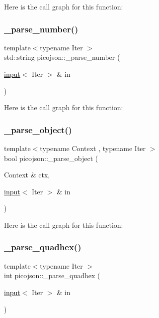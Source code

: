 Here is the call graph for this function\+:
\hypertarget{namespacepicojson_a771defe1d981b7091c2156bf4720625c}{}\label{namespacepicojson_a771defe1d981b7091c2156bf4720625c} 
\subsubsection{\texorpdfstring{\+\_\+parse\+\_\+number()}{\_parse\_number()}}
{\footnotesize\ttfamily template$<$typename Iter $>$ \\
std\+::string picojson\+::\+\_\+parse\+\_\+number (\begin{DoxyParamCaption}\item[{\hyperlink{classpicojson_1_1input}{input}$<$ Iter $>$ \&}]{in }\end{DoxyParamCaption})\hspace{0.3cm}{\ttfamily [inline]}}

Here is the call graph for this function\+:
\hypertarget{namespacepicojson_a480ed5e3461568672197a42e259a44c9}{}\label{namespacepicojson_a480ed5e3461568672197a42e259a44c9} 
\subsubsection{\texorpdfstring{\+\_\+parse\+\_\+object()}{\_parse\_object()}}
{\footnotesize\ttfamily template$<$typename Context , typename Iter $>$ \\
bool picojson\+::\+\_\+parse\+\_\+object (\begin{DoxyParamCaption}\item[{Context \&}]{ctx,  }\item[{\hyperlink{classpicojson_1_1input}{input}$<$ Iter $>$ \&}]{in }\end{DoxyParamCaption})\hspace{0.3cm}{\ttfamily [inline]}}

Here is the call graph for this function\+:
\hypertarget{namespacepicojson_a92d4f60542bbdfe8203f10e1fcce9368}{}\label{namespacepicojson_a92d4f60542bbdfe8203f10e1fcce9368} 
\subsubsection{\texorpdfstring{\+\_\+parse\+\_\+quadhex()}{\_parse\_quadhex()}}
{\footnotesize\ttfamily template$<$typename Iter $>$ \\
int picojson\+::\+\_\+parse\+\_\+quadhex (\begin{DoxyParamCaption}\item[{\hyperlink{classpicojson_1_1input}{input}$<$ Iter $>$ \&}]{in }\end{DoxyParamCaption})\hspace{0.3cm}{\ttfamily [inline]}}

